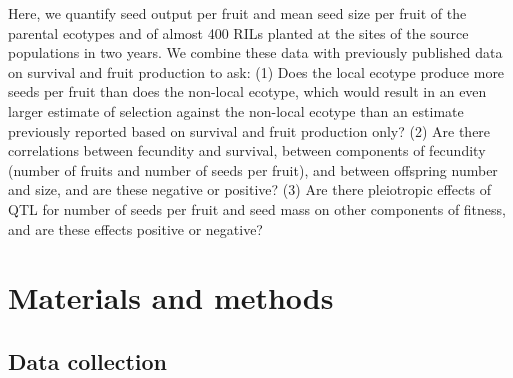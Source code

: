\documentclass[]{article}
\begin{document}
Here, we quantify seed output per fruit and mean seed size per fruit of the parental ecotypes and of almost 400 RILs planted at the sites of the source populations in two years. We combine these data with previously published data on survival and fruit production to ask: (1) Does the local ecotype produce more seeds per fruit than does the non-local ecotype, which would result in an even larger estimate of selection against the non-local ecotype than an estimate previously reported based on survival and fruit production only? (2) Are there correlations between fecundity and survival, between components of fecundity (number of fruits and number of seeds per fruit), and between offspring number and size, and are these negative or positive? (3) Are there pleiotropic effects of QTL for number of seeds per fruit and seed mass on other components of fitness, and are these effects positive or negative?

\hypertarget{materials-and-methods}{%
\section{Materials and methods}\label{materials-and-methods}}

\hypertarget{data-collection}{%
\subsection{Data collection}\label{data-collection}}
\end{document}
